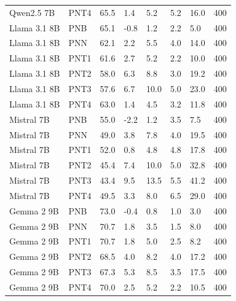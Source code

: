 \begin{tabular}{llllllll}
  Qwen2.5 7B &    PNT4 &        65.5 &  1.4 &          5.2 &             5.2 &            16.0 & 400 \\
Llama 3.1 8B &     PNB &        65.1 & -0.8 &          1.2 &             2.2 &             5.0 & 400 \\
Llama 3.1 8B &     PNN &        62.1 &  2.2 &          5.5 &             4.0 &            14.0 & 400 \\
Llama 3.1 8B &    PNT1 &        61.6 &  2.7 &          5.2 &             2.2 &            10.0 & 400 \\
Llama 3.1 8B &    PNT2 &        58.0 &  6.3 &          8.8 &             3.0 &            19.2 & 400 \\
Llama 3.1 8B &    PNT3 &        57.6 &  6.7 &         10.0 &             5.0 &            23.0 & 400 \\
Llama 3.1 8B &    PNT4 &        63.0 &  1.4 &          4.5 &             3.2 &            11.8 & 400 \\
  Mistral 7B &     PNB &        55.0 & -2.2 &          1.2 &             3.5 &             7.5 & 400 \\
  Mistral 7B &     PNN &        49.0 &  3.8 &          7.8 &             4.0 &            19.5 & 400 \\
  Mistral 7B &    PNT1 &        52.0 &  0.8 &          4.8 &             4.8 &            17.8 & 400 \\
  Mistral 7B &    PNT2 &        45.4 &  7.4 &         10.0 &             5.0 &            32.8 & 400 \\
  Mistral 7B &    PNT3 &        43.4 &  9.5 &         13.5 &             5.5 &            41.2 & 400 \\
  Mistral 7B &    PNT4 &        49.5 &  3.3 &          8.0 &             6.5 &            29.0 & 400 \\
  Gemma 2 9B &     PNB &        73.0 & -0.4 &          0.8 &             1.0 &             3.0 & 400 \\
  Gemma 2 9B &     PNN &        70.7 &  1.8 &          3.5 &             1.5 &             8.0 & 400 \\
  Gemma 2 9B &    PNT1 &        70.7 &  1.8 &          5.0 &             2.5 &             8.2 & 400 \\
  Gemma 2 9B &    PNT2 &        68.5 &  4.0 &          8.2 &             4.0 &            17.2 & 400 \\
  Gemma 2 9B &    PNT3 &        67.3 &  5.3 &          8.5 &             3.5 &            17.5 & 400 \\
  Gemma 2 9B &    PNT4 &        70.0 &  2.5 &          5.2 &             2.2 &            10.5 & 400 \\

\end{tabular}

